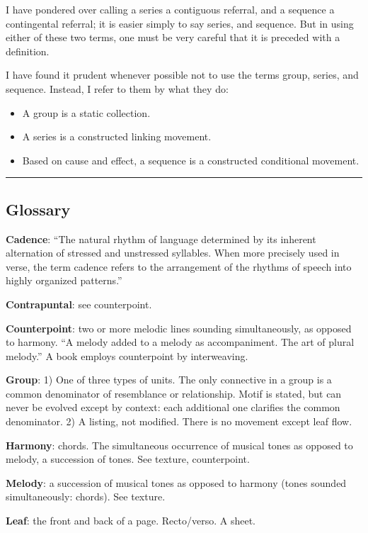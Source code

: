 \documentclass[12pt]{extarticle}
\begin{document}
I have pondered over calling a series a contiguous referral, and a sequence a contingental referral; it is easier simply to say series, and sequence. But in using either of these two terms, one must be very careful that it is preceded with a definition.

I have found it prudent whenever possible not to use the terms group, series, and sequence. Instead, I refer to them by what they do:

\begin{itemize}
  \item A group is a static collection.
  \item A series is a constructed linking movement.
  \item Based on cause and effect, a sequence is a constructed conditional movement.
\end{itemize}

\rule{\textwidth}{0.4pt}

\subsection*{Glossary}

\textbf{Cadence}: ``The natural rhythm of language determined by its inherent alternation of stressed and unstressed syllables. When more precisely used in verse, the term cadence refers to the arrangement of the rhythms of speech into highly organized patterns.''

\textbf{Contrapuntal}: see counterpoint.

\textbf{Counterpoint}: two or more melodic lines sounding simultaneously, as opposed to harmony. ``A melody added to a melody as accompaniment. The art of plural melody.'' A book employs counterpoint by interweaving.

\textbf{Group}: 1) One of three types of units. The only connective in a group is a common denominator of resemblance or relationship. Motif is stated, but can never be evolved except by context: each additional one clarifies the common denominator. 2) A listing, not modified. There is no movement except leaf flow.

\textbf{Harmony}: chords. The simultaneous occurrence of musical tones as opposed to melody, a succession of tones. See texture, counterpoint.

\textbf{Melody}: a succession of musical tones as opposed to harmony (tones sounded simultaneously: chords). See texture.

\textbf{Leaf}: the front and back of a page. Recto/verso. A sheet.
\end{document}
